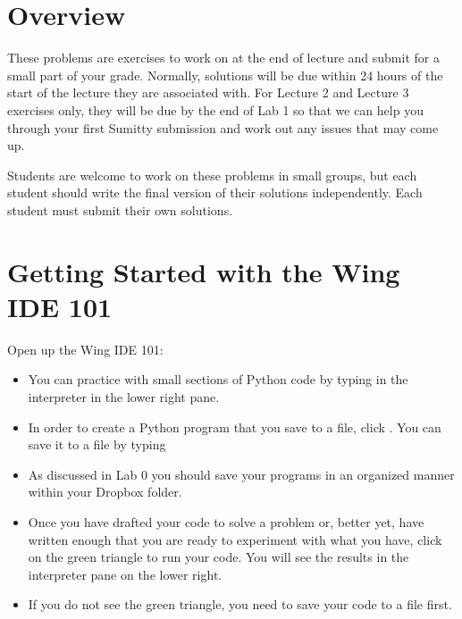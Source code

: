 \documentclass[letterpaper,10pt,english]{sphinxmanual}
\begin{document}
\section{Overview}
\label{\detokenize{lecture_notes/lec02_calculator_exercises/exercises:overview}}
These problems are exercises to work on at the end of lecture and
submit for a small part of your grade.  Normally, solutions will be
due within 24 hours of the start of the lecture they are associated
with.  For Lecture 2 and Lecture 3 exercises only, they will be due by the end
of Lab 1 so that we can help you through your first Sumitty submission
and work out any issues that may come up.

Students are welcome to work on these problems in small groups, but
each student should write the final version of their solutions
independently.  Each student must submit their own solutions.


\section{Getting Started with the Wing IDE 101}
\label{\detokenize{lecture_notes/lec02_calculator_exercises/exercises:getting-started-with-the-wing-ide-101}}
Open up the Wing IDE 101:
\begin{itemize}
\item {} 
You can practice with small sections of Python code by typing in the
interpreter in the lower right pane.

\item {} 
In order to create a Python program that you save to a file, click
. You can save it to a file by typing 

\item {} 
As discussed in Lab 0 you should save your programs in an organized
manner within your Dropbox folder.

\item {} 
Once you have drafted your code to solve a problem or, better yet,
have written enough that you are ready to experiment with what you
have, click on the green triangle to run your code.  You will see
the results in the interpreter pane on the lower right.

\item {} 
If you do not see the green triangle, you need to save your code
to a file first.

\end{itemize}
\end{document}
